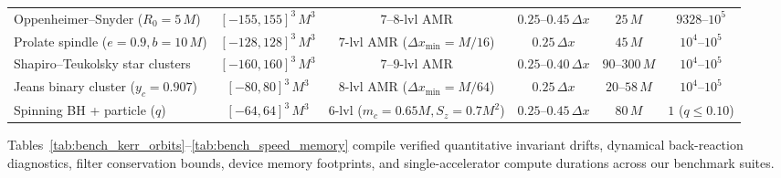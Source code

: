 \begin{table}[tbp]
\begin{ruledtabular}
\begin{tabular}{lccccc}
Oppenheimer--Snyder ($R_0=5\,M$) & $[-155,155]^3\,M^3$ & $7\text{--}8$-lvl AMR & $0.25\text{--}0.45\,\Delta x$ & $25\,M$ & $9328\text{--}10^5$ \\
Prolate spindle ($e=0.9, b=10\,M$) & $[-128,128]^3\,M^3$ & $7$-lvl AMR ($\Delta x_{\min}=M/16$) & $0.25\,\Delta x$ & $45\,M$ & $10^4\text{--}10^5$ \\
Shapiro--Teukolsky star clusters & $[-160,160]^3\,M^3$ & $7\text{--}9$-lvl AMR & $0.25\text{--}0.40\,\Delta x$ & $90\text{--}300\,M$ & $10^4\text{--}10^5$ \\
Jeans binary cluster ($y_c=0.907$) & $[-80,80]^3\,M^3$ & $8$-lvl AMR ($\Delta x_{\min}=M/64$) & $0.25\,\Delta x$ & $20\text{--}58\,M$ & $10^4\text{--}10^5$ \\
Spinning BH + particle ($q$) & $[-64,64]^3\,M^3$ & $6$-lvl ($m_c=0.65M, S_z=0.7M^2$) & $0.25\text{--}0.45\,\Delta x$ & $80\,M$ & $1$ ($q \le 0.10$) \\
\end{tabular}
\end{ruledtabular}
\end{table}

Tables~\ref{tab:bench_kerr_orbits}--\ref{tab:bench_speed_memory} compile verified quantitative invariant drifts, dynamical back-reaction diagnostics, filter conservation bounds, device memory footprints, and single-accelerator compute durations across our benchmark suites.

